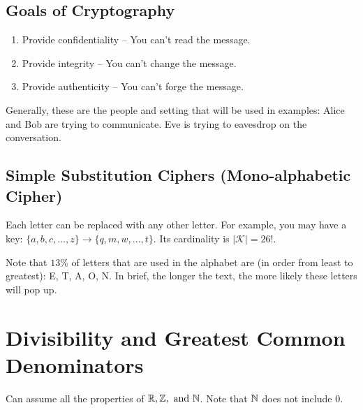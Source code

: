 \subsection{Goals of Cryptography}

\begin{enumerate}
    \item Provide confidentiality -- You can't read the message.
    \item Provide integrity -- You can't change the message.
    \item Provide authenticity -- You can't forge the message.
\end{enumerate}

Generally, these are the people and setting that will be used in examples: Alice and Bob are trying to communicate. Eve is trying to eavesdrop on the conversation. \\

\subsection{Simple Substitution Ciphers (Mono-alphabetic Cipher)}

Each letter can be replaced with any other letter. For example, you may have a key: \(\{a,b,c,\dots,z\} \rightarrow \{q,m,w,\dots,t\}\). Its cardinality is \(|\mathcal{K}| = 26!\). \\



 Note that \(13\%\) of letters that are used in the alphabet are (in order from least to greatest): E, T, A, O, N. In brief, the longer the text, the more likely these letters will pop up.

\section{Divisibility and Greatest Common Denominators}

Can assume all the properties of \(\mathbb{R}, \mathbb{Z}, \text{ and } \mathbb{N}\). Note that \(\mathbb{N}\) does not include 0. \\


